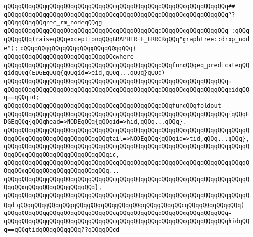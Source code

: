 \verb|qQQqqQQqqQQqqQQqqQQqqQQqqQQqqQQqqQQqqQQqqQQqqQQqqQQqqQQqqQQqqQQq##|\newline
\verb|qQQqqQQqqQQqqQQqqQQqqQQqqQQqqQQqqQQqqQQqqQQqqQQqqQQqqQQqqQQqqQQq??qQQqqQQqqQQqrec_rm_nodeqQQqg|\newline
\verb|qQQqqQQqqQQqqQQqqQQqqQQqqQQqqQQqqQQqqQQqqQQqqQQqqQQqqQQqqQQqqQQq::qQQqqQQqqQQq(raiseqQQqexceptionqQQqGRAPHTREE_ERRORqQQq"graphtree::drop_node");|\newline
\verb|qQQqqQQqqQQqqQQqqQQqqQQqqQQqqQQq}|\newline
\verb|qQQqqQQqqQQqqQQqqQQqqQQqqQQqqQQqwhere|\newline
\verb|qQQqqQQqqQQqqQQqqQQqqQQqqQQqqQQqqQQqqQQqqQQqqQQqfunqQQqeq_predicateqQQqidqQQq(EDGEqQQq{qQQqid=>eid,qQQq...qQQq}qQQq)|\newline
\verb|qQQqqQQqqQQqqQQqqQQqqQQqqQQqqQQqqQQqqQQqqQQqqQQqqQQqqQQqqQQqqQQq=|\newline
\verb|qQQqqQQqqQQqqQQqqQQqqQQqqQQqqQQqqQQqqQQqqQQqqQQqqQQqqQQqqQQqqQQqeidqQQq==qQQqid;|\newline
\newline
\newline
\verb|qQQqqQQqqQQqqQQqqQQqqQQqqQQqqQQqqQQqqQQqqQQqqQQqfunqQQqfoldout|\newline
\verb|qQQqqQQqqQQqqQQqqQQqqQQqqQQqqQQqqQQqqQQqqQQqqQQqqQQqqQQqqQQqqQQq(qQQqEDGEqQQq{qQQqhead=>NODEqQQq{qQQqid=>hid,qQQq...qQQq},|\newline
\verb|qQQqqQQqqQQqqQQqqQQqqQQqqQQqqQQqqQQqqQQqqQQqqQQqqQQqqQQqqQQqqQQqqQQqqQQqqQQqqQQqqQQqqQQqqQQqqQQqqQQqtail=>NODEqQQq{qQQqid=>tid,qQQq...qQQq},|\newline
\verb|qQQqqQQqqQQqqQQqqQQqqQQqqQQqqQQqqQQqqQQqqQQqqQQqqQQqqQQqqQQqqQQqqQQqqQQqqQQqqQQqqQQqqQQqqQQqqQQqqQQqid,|\newline
\verb|qQQqqQQqqQQqqQQqqQQqqQQqqQQqqQQqqQQqqQQqqQQqqQQqqQQqqQQqqQQqqQQqqQQqqQQqqQQqqQQqqQQqqQQqqQQqqQQqqQQq...|\newline
\verb|qQQqqQQqqQQqqQQqqQQqqQQqqQQqqQQqqQQqqQQqqQQqqQQqqQQqqQQqqQQqqQQqqQQqqQQqqQQqqQQqqQQqqQQqqQQqqQQq},|\newline
\verb|qQQqqQQqqQQqqQQqqQQqqQQqqQQqqQQqqQQqqQQqqQQqqQQqqQQqqQQqqQQqqQQqqQQqqQQqd|\newline
\verb|qQQqqQQqqQQqqQQqqQQqqQQqqQQqqQQqqQQqqQQqqQQqqQQqqQQqqQQqqQQqqQQq)|\newline
\verb|qQQqqQQqqQQqqQQqqQQqqQQqqQQqqQQqqQQqqQQqqQQqqQQqqQQqqQQqqQQqqQQq=|\newline
\verb|qQQqqQQqqQQqqQQqqQQqqQQqqQQqqQQqqQQqqQQqqQQqqQQqqQQqqQQqqQQqqQQqhidqQQq==qQQqtidqQQqqQQqqQQq??qQQqqQQqd|\newline
